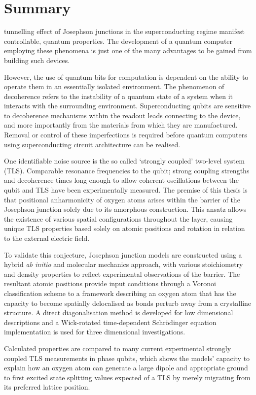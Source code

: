 \chapter*{Summary}
\vspace{-1.2cm}
 tunnelling effect of Josephson junctions in the superconducting regime manifest controllable, quantum properties.
The development of a quantum computer employing these phenomena is just one of the many advantages to be gained from building such devices.

However, the use of quantum bits for computation is dependent on the ability to operate them in an essentially isolated environment.
The phenomenon of decoherence refers to the instability of a quantum state of a system when it interacts with the surrounding environment.
Superconducting qubits are sensitive to decoherence mechanisms within the readout leads connecting to the device, and more importantly from the materials from which they are manufactured.
Removal or control of these imperfections is required before quantum computers using superconducting circuit architecture can be realised.

One identifiable noise source is the so called `strongly coupled' two-level system (TLS).
Comparable resonance frequencies to the qubit; strong coupling strengths and decoherence times long enough to allow coherent oscillations between the qubit and TLS have been experimentally measured.
The premise of this thesis is that positional anharmonicity of oxygen atoms arises within the  barrier of the Josephson junction solely due to its amorphous construction.
This ansatz allows the existence of various spatial configurations throughout the layer, causing unique TLS properties based solely on atomic positions and rotation in relation to the external electric field.

To validate this conjecture, Josephson junction models are constructed using a hybrid \textit{ab initio} and molecular mechanics approach, with various stoichiometry and density properties to reflect experimental observations of the barrier.
The resultant atomic positions provide input conditions through a Voronoi classification scheme to a framework describing an oxygen atom that has the capacity to become spatially delocalised as bonds perturb away from a crystalline structure.
A direct diagonalisation method is developed for low dimensional descriptions and a Wick-rotated time-dependent Schrödinger equation implementation is used for three dimensional investigations.

Calculated properties are compared to many current experimental strongly coupled TLS measurements in phase qubits, which shows the models' capacity to explain how an oxygen atom can generate a large dipole and appropriate ground to first excited state splitting values expected of a TLS by merely migrating from its preferred lattice position.

